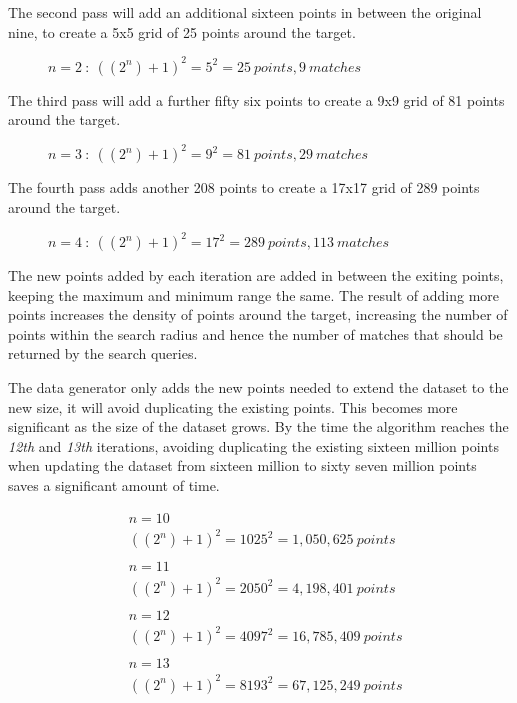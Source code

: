 \documentclass{article}
\newcommand{\dataset} {dataset\xspace}
\begin{document}
The second pass will add an additional sixteen points in between the original nine, to create a 5x5 grid of 25 points around the target. 
\begin{figure}[h]

\caption{$n=2 \ :\ ((2^n)+1)^2 = 5^2 = 25 \ points, 9 \ matches$}
\label{fig:data-count-02}
\end{figure}

The third pass will add a further fifty six points to create a 9x9 grid of 81 points around the target. 
\begin{figure}[h]

\caption{$n=3 \ :\ ((2^n)+1)^2 = 9^2 = 81 \ points, 29 \ matches$}
\label{fig:data-count-03}
\end{figure}

The fourth pass adds another 208 points to create a 17x17 grid of 289 points around the target. \begin{figure}[h]

\caption{$n=4 \ :\ ((2^n)+1)^2 = 17^2 = 289 \ points, 113 \ matches$}
\label{fig:data-count-04}
\end{figure}

The new points added by each iteration are added in between the exiting points, keeping the maximum and minimum range the same. The result of adding more points increases the density of points around the target, increasing the number of points within the search radius and hence the number of matches that should be returned by the search queries.

The data generator only adds the new points needed to extend the \dataset to the new size, it will avoid duplicating the existing points.
This becomes more significant as the size of the \dataset grows. By the time the algorithm reaches the \textit{12th} and \textit{13th} iterations, avoiding duplicating the existing sixteen million points when updating the \dataset from sixteen million to sixty seven million points saves a significant amount of time.

\begin{equation*}
\begin{split}
& n = 10\\
& ((2^n)+1)^2 = 1025^2 = 1,050,625 \ points
\\
\\
& n = 11\\
& ((2^n)+1)^2 = 2050^2 = 4,198,401 \ points
\\
\\
& n = 12\\
& ((2^n)+1)^2 = 4097^2 = 16,785,409 \ points
\\
\\
& n = 13\\
& ((2^n)+1)^2 = 8193^2 = 67,125,249 \ points
\end{split}
\end{equation*}
\end{document}
